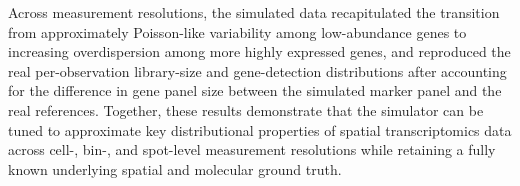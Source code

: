 Across measurement resolutions, the simulated data recapitulated the transition from approximately Poisson-like variability among low-abundance genes to increasing overdispersion among more highly expressed genes, and reproduced the real per-observation library-size and gene-detection distributions after accounting for the difference in gene panel size between the simulated marker panel and the real references. Together, these results demonstrate that the simulator can be tuned to approximate key distributional properties of spatial transcriptomics data across cell-, bin-, and spot-level measurement resolutions while retaining a fully known underlying spatial and molecular ground truth.
